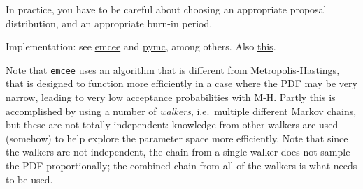 \documentclass[12pt]{article}
\begin{document}
In practice, you have to be careful about choosing an appropriate
proposal distribution, and an appropriate burn-in period.

Implementation: see \href{http://dan.iel.fm/emcee/current/}
{emcee} and \href{https://pymc-devs.github.io/pymc/}
{pymc}, among others. Also
\href{http://jakevdp.github.io/blog/2014/06/14/frequentism-and-bayesianism-4-bayesian-in-python/}
{this}.

Note that \texttt{emcee} uses an algorithm that is different from
Metropolis-Hastings, that is designed to function more efficiently
in a case where the PDF may be very narrow, leading to very low
acceptance probabilities with M-H. Partly this is accomplished by
using a number of \emph{walkers}, i.e.\ multiple different Markov
chains, but these are not totally independent: knowledge from other
walkers are used (somehow) to help explore the parameter space more
efficiently. Note that since the walkers are not independent, the
chain from a single walker does not sample the PDF proportionally;
the combined chain from all of the walkers is what needs to be used.
\end{document}
